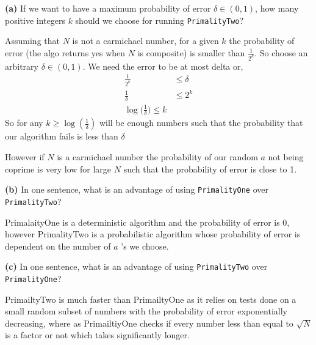 \documentclass[12pt]{article}
\newcommand{\question}[3][Q]{
\begin{description}
\item \textbf{#1{#2}} #3
\end{description}
}
\begin{document}
\question[]{(a)}{
    If we want to have a maximum probability of error $\delta \in (0,1)$, how many positive integers $k$ should we choose for running \texttt{PrimalityTwo}? 
}

\begin{answer}
    Assuming that $N$ is not a carmichael number, for a given $k$ the probability of error (the algo returns yes when $N$ is composite) is smaller than $\frac{1}{2^{k}}$. So choose an arbitrary $\delta \in (0,1)$. We need the error to be at most delta or,  
    \begin{align*}
        \frac{1}{2^{k}} &\le \delta\\
        \frac{1}{\delta} &\le 2^{k}\\
        \log \bigg(\frac{1}{\delta} \bigg ) \le k
    \end{align*}
    So for any $k \ge \log (\frac{1}{\delta}) $ will be enough numbers such that the probability that our algorithm fails is less than  $\delta$

    However if $N$ is a carmichael number the probability of our random $a$ not being coprime is very low for large $N$ such that the probability of error is close to 1.
\end{answer}


\question[]{(b)}{
    In one sentence, what is an advantage of using \texttt{PrimalityOne} over \texttt{PrimalityTwo}?
}

\begin{answer}
    PrimalaityOne is a deterministic algorithm and the probability of error is 0, however PrimalityTwo is a probabilistic algorithm whose probability of error is dependent on the number of $a$ 's we choose.
\end{answer}

\question[]{(c)}{
    In one sentence, what is an advantage of using \texttt{PrimalityTwo} over \texttt{PrimalityOne}?
}

\begin{answer}
    PrimailtyTwo is much faster than PrimailtyOne as it relies on tests done on a small random subset of numbers with the probability of error exponentially decreasing, where as PrimailtiyOne checks if every number less than equal to $\sqrt{N}$ is a factor or not which takes significantly longer.
\end{answer}
\end{document}

